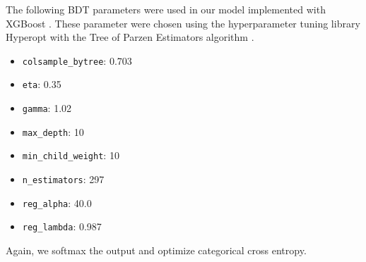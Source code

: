 \documentclass[aps,prd,twocolumn,superscriptaddress,floatfix,longbibliography,preprintnumbers,nofootinbib]{revtex4-1} %
\newcounter{para}
\begin{document}
The following BDT parameters were used in our model implemented with {\sc XGBoost} \cite{Chen:2016:XST:2939672.2939785}.
%
These parameter were chosen using the hyperparameter tuning library {\sc Hyperopt} \cite{Bergstra2013} with the Tree of Parzen Estimators algorithm \cite{Bergstra2011}.
%
\begin{itemize}
 \item \texttt{colsample\_bytree}: 0.703
 \item \texttt{eta}: 0.35
 \item \texttt{gamma}: 1.02
 \item \texttt{max\_depth}: 10
 \item \texttt{min\_child\_weight}: 10
 \item \texttt{n\_estimators}: 297
 \item \texttt{reg\_alpha}: 40.0
 \item \texttt{reg\_lambda}: 0.987
\end{itemize}
%
Again, we softmax the output and optimize categorical cross entropy. 


\end{document}
